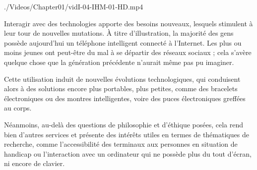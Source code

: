 \begin{marginvideo}
	\vspace*{-36pt}%
		{./Videos/Chapter01/vidI-04-IHM-01-HD.mp4}%
\end{marginvideo}

Interagir avec des technologies apporte des besoins nouveaux, lesquels stimulent à leur tour de nouvelles mutations. À titre d'illustration, la majorité 
des gens possède aujourd'hui un téléphone intelligent connecté à l'Internet. Les plus ou moins jeunes ont peut-être du mal à se départir des réseaux sociaux ; cela s'avère quelque chose que la génération précédente n'aurait même pas pu imaginer.

Cette utilisation induit de nouvelles évolutions technologiques, qui conduisent alors à des solutions encore plus portables, plus petites, comme des bracelets électroniques ou des montres intelligentes, voire des puces électroniques greffées au corps.

Néanmoins, au-delà des questions de philosophie et d'éthique posées, cela rend bien d'autres services et présente des intérêts utiles en termes de thématiques de recherche, comme l'accessibilité des terminaux aux personnes en situation de handicap ou l'interaction avec un ordinateur qui ne possède plus du tout d'écran, ni encore de clavier.

